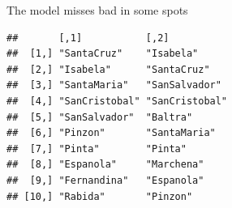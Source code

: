 \documentclass[
  ignorenonframetext,
]{beamer}
\newenvironment{Shaded}{\begin{snugshade}}{\end{snugshade}}
\newcommand{\AttributeTok}[1]{\textcolor[rgb]{0.77,0.63,0.00}{#1}}
\newcommand{\DecValTok}[1]{\textcolor[rgb]{0.00,0.00,0.81}{#1}}
\newcommand{\FunctionTok}[1]{\textcolor[rgb]{0.00,0.00,0.00}{#1}}
\newcommand{\NormalTok}[1]{#1}
\newcommand{\OtherTok}[1]{\textcolor[rgb]{0.56,0.35,0.01}{#1}}
\newcommand{\SpecialCharTok}[1]{\textcolor[rgb]{0.00,0.00,0.00}{#1}}
\newcommand{\StringTok}[1]{\textcolor[rgb]{0.31,0.60,0.02}{#1}}
\begin{document}
\begin{frame}[fragile]{}
\protect\hypertarget{section-23}{}
The model misses bad in some spots

\vspace{12pt}
\tiny

\begin{Shaded}
\end{Shaded}

\begin{verbatim}
##       [,1]           [,2]          
##  [1,] "SantaCruz"    "Isabela"     
##  [2,] "Isabela"      "SantaCruz"   
##  [3,] "SantaMaria"   "SanSalvador" 
##  [4,] "SanCristobal" "SanCristobal"
##  [5,] "SanSalvador"  "Baltra"      
##  [6,] "Pinzon"       "SantaMaria"  
##  [7,] "Pinta"        "Pinta"       
##  [8,] "Espanola"     "Marchena"    
##  [9,] "Fernandina"   "Espanola"    
## [10,] "Rabida"       "Pinzon"
\end{verbatim}
\end{frame}
\end{document}

